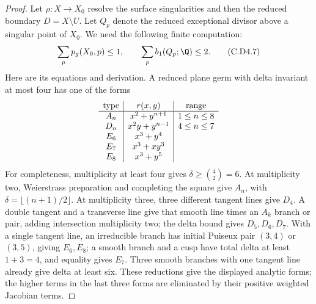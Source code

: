 \begin{proof}
Let $\rho:X\to X_0$ resolve the surface singularities and
then the reduced boundary $D=X\setminus U$. Let $Q_p$ denote
the reduced exceptional divisor above a singular point of
$X_0$. We need the following finite computation:
\[
  \sum_p p_g(X_0,p)\le1,\qquad
  \sum_p b_1(Q_p;\Q)\le2.
\tag{C.D4.7}
\]
Here are its equations and derivation. A reduced plane germ
with delta invariant at most four has one of the forms
\[
\begin{array}{c|c|c}
 \hbox{type}&r(x,y)&\hbox{range}\\ \hline
 A_n&x^2+y^{n+1}&1\le n\le8\\
 D_n&x^2y+y^{n-1}&4\le n\le7\\
 E_6&x^3+y^4&\\
 E_7&x^3+xy^3&\\
 E_8&x^3+y^5&
\end{array}
\]
For completeness, multiplicity at least four gives
$\delta\ge\binom42=6$. At multiplicity two, Weierstrass
preparation and completing the square give $A_n$, with
$\delta=\lfloor(n+1)/2\rfloor$. At multiplicity three,
three different tangent lines give $D_4$. A double tangent
and a transverse line give that smooth line times an
$A_k$ branch or pair, adding intersection multiplicity two;
the delta bound gives $D_5,D_6,D_7$. With a single tangent
line, an irreducible branch has initial Puiseux pair $(3,4)$
or $(3,5)$, giving $E_6,E_8$; a smooth branch and a cusp
have total delta at least $1+3=4$, and equality gives $E_7$.
Three smooth branches with one tangent line already give
delta at least six. These reductions give the displayed
analytic forms; the higher terms in the last three forms
are eliminated by their positive weighted Jacobian terms.


\end{proof}
